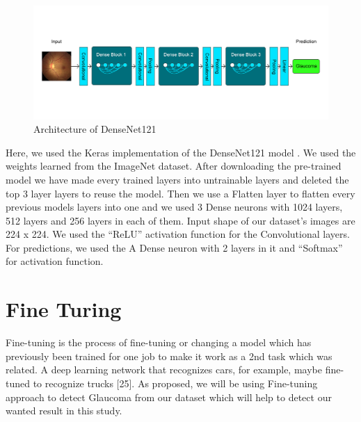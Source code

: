 \vspace{5mm}
\begin{figure}[hbt!]
\centering
\includegraphics[scale=0.4]{images/densenet archinew.png}
\caption{Architecture of DenseNet121}
\label{fig:x Model Summary of DenseNet121}
\end{figure}
\vspace{5mm}

\noindent Here, we used the Keras implementation of the DenseNet121 model . We used the weights learned from the ImageNet dataset. After downloading the pre-trained model we have made every trained layers into untrainable layers and deleted the top 3 layer layers to reuse the model. Then we use a Flatten layer to flatten every previous models layers into one and we used 3 Dense neurons with 1024 layers, 512 layers and 256 layers in each of them. Input shape of our dataset's images are 224 x 224. We used the “ReLU” activation function for the Convolutional layers. For predictions, we used the A Dense neuron with 2 layers in it and “Softmax” for activation function.



\section{Fine Turing}
Fine-tuning is the process of fine-tuning or changing a model which has previously been trained for one job to make it work as a 2nd task which was related. A deep learning network that recognizes cars, for example, maybe fine-tuned to recognize trucks [25]. As proposed, we will be using Fine-tuning approach to detect Glaucoma from our dataset which will help to detect our wanted result in this study.

